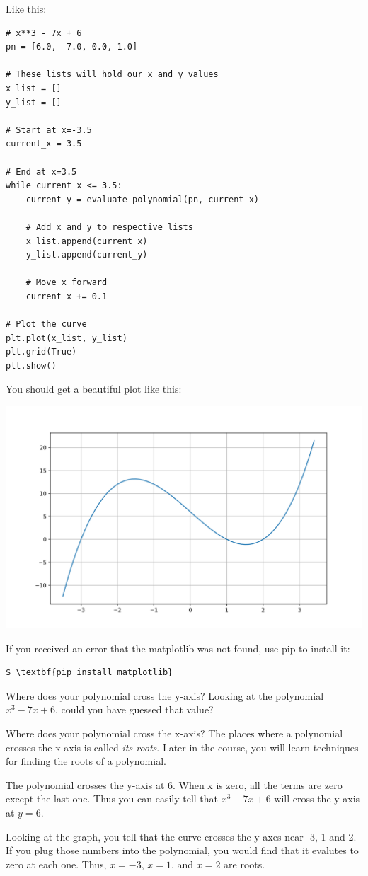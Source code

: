 Like this:
\begin{Verbatim}
# x**3 - 7x + 6
pn = [6.0, -7.0, 0.0, 1.0]

# These lists will hold our x and y values
x_list = []
y_list = []

# Start at x=-3.5
current_x =-3.5

# End at x=3.5
while current_x <= 3.5:
    current_y = evaluate_polynomial(pn, current_x)

    # Add x and y to respective lists
    x_list.append(current_x)
    y_list.append(current_y)

    # Move x forward
    current_x += 0.1

# Plot the curve
plt.plot(x_list, y_list)
plt.grid(True)
plt.show()
\end{Verbatim}

You should get a beautiful plot like this:

\includegraphics[width=\textwidth]{polyplot1.png}

If you received an error that the matplotlib was not found, use pip to install it:
\begin{Verbatim}[commandchars=\\\{\}]
$ \textbf{pip install matplotlib}
\end{Verbatim}

\begin{Exercise}[title={Observations}, label=plotobservations]
  Where does your polynomial cross the y-axis? Looking at the
  polynomial $x^3 - 7x + 6$, could you have guessed that value?

  \vspace{20mm}
  
  Where does your polynomial cross the x-axis? The places where a
  polynomial crosses the x-axis is called \emph{its roots}. Later in
  the course, you will learn techniques for finding the roots of a
  polynomial.
\end{Exercise}
\begin{Answer}[ref=plotobservations]
  The polynomial crosses the y-axis at 6. When x is zero, all the terms are zero except the
  last one. Thus you can easily tell that $x^3 - 7x + 6$ will cross the y-axis at $y=6$.

  Looking at the graph, you tell that the curve crosses the y-axes
  near -3, 1 and 2. If you plug those numbers into the polynomial, you
  would find that it evalutes to zero at each one. Thus, $x=-3$, $x=1$, and $x=2$ are roots.
\end{Answer}

